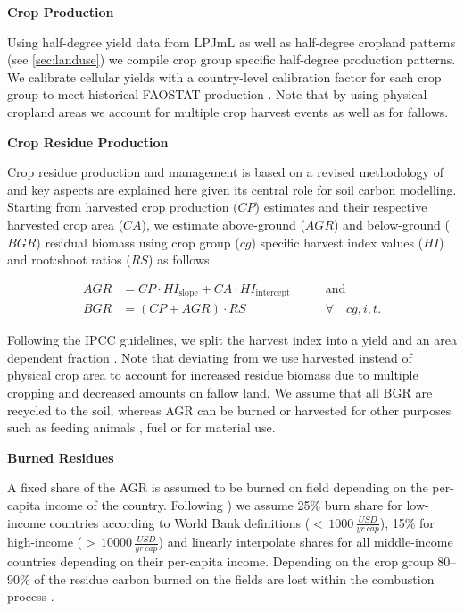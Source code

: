 \documentclass[gc, manuscript]{copernicus}
\begin{document}
\textbf{Crop Production}

Using half-degree yield data from LPJmL \citep{schaphoff_lpjml4_2018} as well as half-degree cropland patterns (see \ref{sec:landuse}) we compile crop group specific half-degree production patterns. We calibrate cellular yields with a country-level calibration factor for each crop group to meet historical FAOSTAT production \citep{faostat_faostat_2016}. Note that by using physical cropland areas we account for multiple crop harvest events as well as for fallows.

\textbf{Crop Residue Production}

Crop residue production and management is based on a revised methodology of \citep{bodirsky_n2o_2012} and key aspects are explained here given its central role for soil carbon modelling. Starting from harvested crop production (\(CP\)) estimates and their respective harvested crop area (\(CA\)), we estimate above-ground (\(AGR\)) and below-ground (\(BGR\)) residual biomass using crop group (\(cg\)) specific harvest index values (\(HI\)) and root:shoot ratios (\(RS\)) as follows

\begin{equation}
\begin{aligned}
AGR & = CP \cdot HI_{\textrm{slope}} + CA \cdot HI_{\textrm{intercept}}\qquad & \textrm{and} \\
BGR & = (CP + AGR) \cdot RS \qquad                                            & \forall\quad cg, i, t.
\label{eq:resbiomass}
\end{aligned}
\end{equation}

Following the IPCC guidelines, we split the harvest index into a yield and an area dependent fraction \citep{ipcc_2006_2006}. Note that deviating from \citep{bodirsky_n2o_2012} we use harvested instead of physical crop area to account for increased residue biomass due to multiple cropping and decreased amounts on fallow land.
We assume that all BGR are recycled to the soil, whereas AGR can be burned or harvested for other purposes such as feeding animals \citep{weindl_livestock_2017}, fuel or for material use.

\textbf{Burned Residues}

A fixed share of the AGR is assumed to be burned on field depending on the per-capita income of the country. Following \citep{smil_nitrogen_1999}) we assume 25\% burn share for low-income countries according to World Bank definitions (\(<\,1000\,\tfrac{USD}{yr\,cap}\)), 15\% for high-income (\(>\,10000\,\tfrac{USD}{yr\,cap}\)) and linearly interpolate shares for all middle-income countries depending on their per-capita income. Depending on the crop group 80--90\% of the residue carbon burned on the fields are lost within the combustion process \citep{ipcc_2006_2006}.
\end{document}
